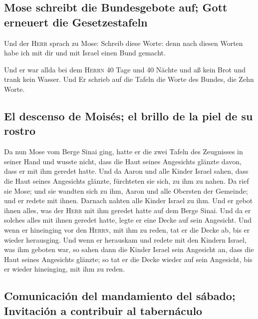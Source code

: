 \hypertarget{mose-schreibt-die-bundesgebote-auf-gott-erneuert-die-gesetzestafeln}{%
\subsection{Mose schreibt die Bundesgebote auf; Gott erneuert die
Gesetzestafeln}\label{mose-schreibt-die-bundesgebote-auf-gott-erneuert-die-gesetzestafeln}}

 Und der \textsc{Herr} sprach zu Mose: Schreib diese
Worte: denn nach diesen Worten habe ich mit dir und mit Israel einen
Bund gemacht.

 Und er war allda bei dem \textsc{Herrn} 40 Tage und 40
Nächte und aß kein Brot und trank kein Wasser. Und Er schrieb auf die
Tafeln die Worte des Bundes, die Zehn Worte.

\hypertarget{el-descenso-de-moisuxe9s-el-brillo-de-la-piel-de-su-rostro}{%
\subsection{El descenso de Moisés; el brillo de la piel de su
rostro}\label{el-descenso-de-moisuxe9s-el-brillo-de-la-piel-de-su-rostro}}

 Da nun Mose vom Berge Sinai ging, hatte er die zwei
Tafeln des Zeugnisses in seiner Hand und wusste nicht, dass die Haut
seines Angesichts glänzte davon, dass er mit ihm geredet hatte.
 Und da Aaron und alle Kinder Israel sahen, dass die Haut
seines Angesichts glänzte, fürchteten sie sich, zu ihm zu nahen.
 Da rief sie Mose; und sie wandten sich zu ihm, Aaron und
alle Obersten der Gemeinde; und er redete mit ihnen. 
Darnach nahten alle Kinder Israel zu ihm. Und er gebot ihnen alles, was
der \textsc{Herr} mit ihm geredet hatte auf dem Berge Sinai.
 Und da er solches alles mit ihnen geredet hatte, legte
er eine Decke auf sein Angesicht.  Und wenn er hineinging
vor den \textsc{Herrn}, mit ihm zu reden, tat er die Decke ab, bis er
wieder herausging. Und wenn er herauskam und redete mit den Kindern
Israel, was ihm geboten war,  so sahen dann die Kinder
Israel sein Angesicht an, dass die Haut seines Angesichts glänzte; so
tat er die Decke wieder auf sein Angesicht, bis er wieder hineinging,
mit ihm zu reden.

\hypertarget{comunicaciuxf3n-del-mandamiento-del-suxe1bado-invitaciuxf3n-a-contribuir-al-tabernuxe1culo}{%
\subsection{Comunicación del mandamiento del sábado; Invitación a
contribuir al
tabernáculo}\label{comunicaciuxf3n-del-mandamiento-del-suxe1bado-invitaciuxf3n-a-contribuir-al-tabernuxe1culo}}

